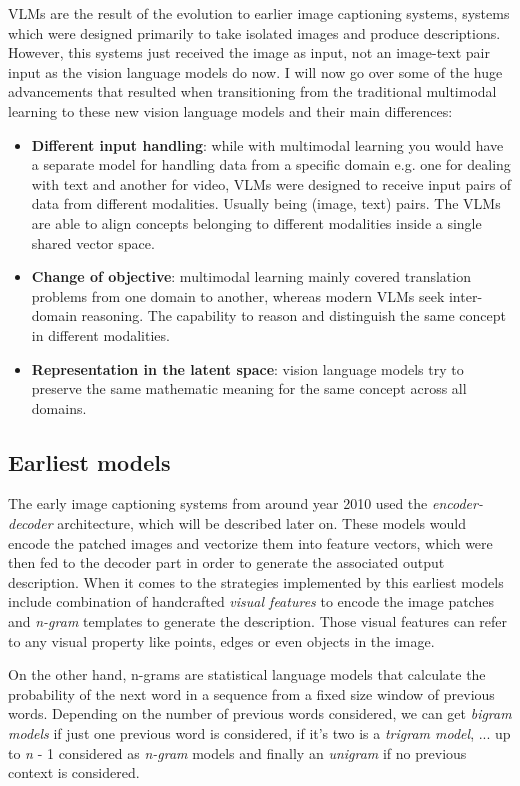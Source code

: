 VLMs are the result of the evolution to earlier image captioning systems, systems which were designed primarily to take isolated images and produce descriptions. However, this systems just received the image as input, not an image-text pair input as the vision language models do now. I will now go over some of the huge advancements that resulted when transitioning from the traditional multimodal learning to these new vision language models and their main differences:

\begin{itemize}
	\item \textbf{Different input handling}: while with multimodal learning you would have a separate model for handling data from a specific domain e.g. one for dealing with text and another for video, VLMs were designed to receive input pairs of data from different modalities. Usually being (image, text) pairs. The VLMs are able to align concepts belonging to different modalities inside a single shared vector space. 
	
	\item \textbf{Change of objective}: multimodal learning mainly covered translation problems from one domain to another, whereas modern VLMs seek inter-domain reasoning. The capability to reason and distinguish the same concept in different modalities.
	
	\item \textbf{Representation in the latent space}: vision language models try to preserve the same mathematic meaning for the same concept across all domains. 
\end{itemize}

\subsection{Earliest models}
The early image captioning systems from around year 2010 used the \textit{encoder-decoder} architecture, which will be described later on. These models would encode the patched images and vectorize them into feature vectors, which were then fed to the decoder part in order to generate the associated output description. When it comes to the strategies implemented by this earliest models include combination of handcrafted \textit{visual features} to encode the image patches and \textit{n-gram} templates to generate the description. Those visual features can refer to any visual property like points, edges or even objects in the image. 

On the other hand, n-grams are statistical language models that calculate the probability of the next word in a sequence from a fixed size window of previous words. Depending on the number of previous words considered, we can get \textit{bigram models} if just one previous word is considered, if it's two is a \textit{trigram model}, ... up to \textit{n} - 1 considered as \textit{n-gram} models and finally an \textit{unigram} if no previous context is considered. 

